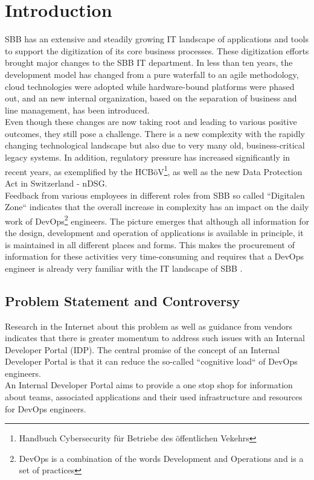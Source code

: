 \documentclass[a4paper,12pt]{article}
\begin{document}
    \section{Introduction}
    \label{sec:introduction}
    SBB has an extensive and steadily growing IT landscape of applications and tools to support the digitization of its
    core business processes.
    These digitization efforts brought major changes to the SBB IT department.
    In less than ten years, the development model has changed from a pure waterfall to an agile methodology,
    cloud technologies were adopted while hardware-bound platforms were phased out, and an new internal organization,
    based on the separation of business and line management, has been introduced.\\
    Even though these changes are now taking root and leading to various positive outcomes, they still pose a challenge.
    There is a new complexity with the rapidly changing technological landscape but also due to very many old,
    business-critical legacy systems.
    In addition, regulatory pressure has increased significantly in recent years, as exemplified by the
    HCBöV\footnote{Handbuch Cybersecurity für Betriebe des öffentlichen Vekehrs}, as well as the new Data Protection Act in Switzerland - nDSG.\\
    Feedback from various employees in different roles from SBB so called ``Digitalen Zone`` indicates that the overall
    increase in complexity has an impact on the daily work of DevOps\footnote{DevOps is a combination of the words
    Development and Operations and is a set of practices} engineers.
    The picture emerges that although all information for the design, development and operation of
    applications is available in principle, it is maintained in all different places and forms.
    This makes the procurement of information for these activities very time-consuming and requires that a DevOps
    engineer is already very familiar with the IT landscape of SBB .

    \subsection{Problem Statement and Controversy}
    \label{subsec:iproblemstatement}
    Research in the Internet about this problem as well as guidance from vendors indicates that there is greater momentum
    to address such issues with an Internal Developer Portal (IDP).
    The central promise of the concept of an Internal Developer Portal is that it can reduce the so-called
    ``cognitive load`` of DevOps engineers.\\
    An Internal Developer Portal aims to provide a one stop shop for information about teams, associated applications and
    their used infrastructure and resources for DevOps engineers.
\end{document}
